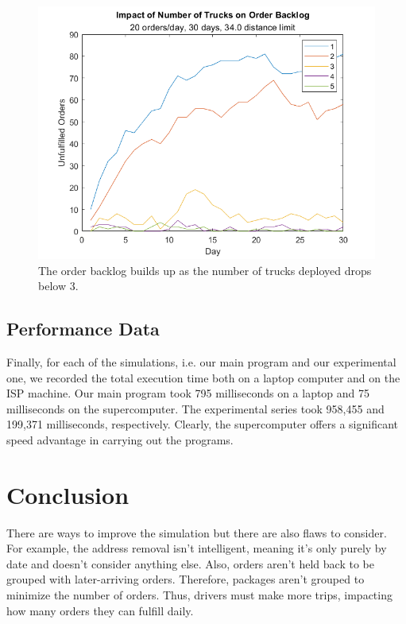 \documentclass[letterpaper]{article}
\begin{document}
    \begin{figure}[h]
        \centering
        \caption{The order backlog builds up as the number of trucks deployed drops below 3.}
        \label{img:experiment2}
        \includegraphics[width=\textwidth]{experiment2.png}
    \end{figure}

    \subsection{Performance Data}
    \label{subsection:Performance_Data}
    Finally, for each of the simulations, i.e. our main program and our experimental one, we recorded the total execution time both on a laptop computer and on the ISP machine. Our main program took 795 milliseconds on a laptop and 75 milliseconds on the supercomputer. The experimental series took 958,455 and 199,371 milliseconds, respectively. Clearly, the supercomputer offers a significant speed advantage in carrying out the programs.

    \section{Conclusion}
    \label{section:Conclusion}
    There are ways to improve the simulation but there are also flaws to consider. For example, the address removal isn’t intelligent, meaning it’s only purely by date and doesn't consider anything else. Also, orders aren’t held back to be grouped with later-arriving orders. Therefore, packages aren't grouped to minimize the number of orders. Thus, drivers must make more trips, impacting how many orders they can fulfill daily.
\end{document}
